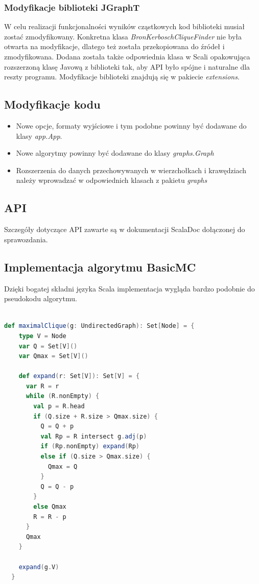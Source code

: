 \documentclass[12pt, a4paper]{article}
\begin{document}
\subsubsection{Modyfikacje biblioteki JGraphT}
W celu realizacji funkcjonalności wyników cząstkowych kod biblioteki musiał zostać zmodyfikowany. Konkretna klasa \emph{BronKerboschCliqueFinder} nie była otwarta na modyfikacje, dlatego też została przekopiowana do źródeł i zmodyfikowana. Dodana została także odpowiednia klasa w Scali opakowująca rozszerzoną klasę Javową z biblioteki tak, aby API było spójne i naturalne dla reszty programu.
Modyfikacje biblioteki znajdują się w pakiecie \emph{extensions}.

\subsection{Modyfikacje kodu}
\begin{itemize}
\item Nowe opcje, formaty wyjściowe i tym podobne powinny być dodawane do klasy \emph{app.App}.
\item Nowe algorytmy powinny być dodawane do klasy \emph{graphs.Graph}
\item Rozszerzenia do danych przechowywanych w wierzchołkach i krawędziach należy wprowadzać w odpowiednich klasach z pakietu \emph{graphs}
\end{itemize}

\subsection{API}
Szczegóły dotyczące API zawarte są w dokumentacji ScalaDoc dołączonej do sprawozdania.


\subsection{Implementacja algorytmu BasicMC}
Dzięki bogatej składni języka Scala implementacja wygląda bardzo podobnie do pseudokodu algorytmu.

\begin{lstlisting}[language=scala]  % Start your code-block

def maximalClique(g: UndirectedGraph): Set[Node] = {
    type V = Node
    var Q = Set[V]()
    var Qmax = Set[V]()

    def expand(r: Set[V]): Set[V] = {
      var R = r
      while (R.nonEmpty) {
        val p = R.head
        if (Q.size + R.size > Qmax.size) {
          Q = Q + p
          val Rp = R intersect g.adj(p)
          if (Rp.nonEmpty) expand(Rp)
          else if (Q.size > Qmax.size) {
            Qmax = Q
          }
          Q = Q - p
        }
        else Qmax
        R = R - p
      }
      Qmax
    }

    expand(g.V)
  }
\end{lstlisting}
\end{document}
